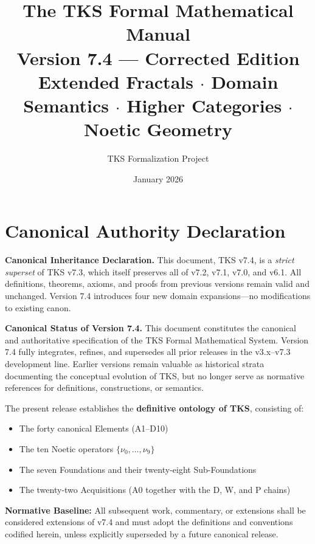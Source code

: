 \documentclass[11pt,twoside,openright]{book}
\title{\Huge\bfseries The TKS Formal Mathematical Manual\\[0.5em]
\Large Version 7.4 --- Corrected Edition\\[1em]
\normalsize Extended Fractals $\cdot$ Domain Semantics $\cdot$ Higher Categories $\cdot$ Noetic Geometry}
\author{TKS Formalization Project}
\date{January 2026}
\theoremstyle{definition}
\theoremstyle{plain}
\theoremstyle{remark}
\newcommand{\infobox}[2]{%
\begin{tcolorbox}[colback=gray!10!white,colframe=gray!75!black,title=\textbf{#1}]
#2
\end{tcolorbox}
}
\begin{document}
\maketitle

\frontmatter

\chapter*{Canonical Authority Declaration}

\infobox{v7.3 $\to$ v7.4 Continuity Bridge}{
\textbf{Canonical Inheritance Declaration.} This document, TKS v7.4, is a \emph{strict superset} of TKS v7.3, which itself preserves all of v7.2, v7.1, v7.0, and v6.1. All definitions, theorems, axioms, and proofs from previous versions remain valid and unchanged. Version 7.4 introduces four new domain expansions---no modifications to existing canon.
}

\textbf{Canonical Status of Version 7.4.} This document constitutes the canonical and authoritative specification of the TKS Formal Mathematical System. Version 7.4 fully integrates, refines, and supersedes all prior releases in the v3.x--v7.3 development line. Earlier versions remain valuable as historical strata documenting the conceptual evolution of TKS, but no longer serve as normative references for definitions, constructions, or semantics.

The present release establishes the \textbf{definitive ontology of TKS}, consisting of:
\begin{itemize}
    \item The forty canonical Elements (A1--D10)
    \item The ten Noetic operators $\{\nu_0, \ldots, \nu_9\}$
    \item The seven Foundations and their twenty-eight Sub-Foundations
    \item The twenty-two Acquisitions (A0 together with the D, W, and P chains)
\end{itemize}

\textbf{Normative Baseline:} All subsequent work, commentary, or extensions shall be considered extensions of v7.4 and must adopt the definitions and conventions codified herein, unless explicitly superseded by a future canonical release.
\end{document}
